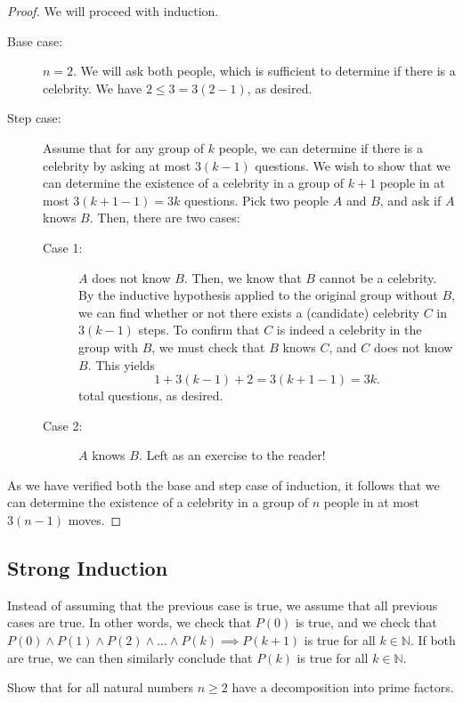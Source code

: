 \documentclass[a4paper]{article}
\begin{document}
\begin{proof}
	We will proceed with induction. 
	\begin{description}
		\item[Base case:] \( n=2 \). We will ask both people, which is sufficient to determine if there is a celebrity. We have \( 2 \le  3 = 3(2-1) \), as desired.
		\item[Step case:] Assume that for any group of \( k \) people, we can determine if there is a celebrity by asking at most \( 3(k-1) \) questions. We wish to show that we can determine the existence of a celebrity in a group of \( k+1 \) people in at most \( 3(k+1-1) =3k \) questions. Pick two people \( A \) and \( B \), and ask if \( A \) knows \( B \). Then, there are two cases:
			\begin{description}
				\item[Case 1:] \( A  \) does not know \( B \). Then, we know that \( B \) cannot be a celebrity. By the inductive hypothesis applied to the original group without \( B \), we can find whether or not there exists a (candidate) celebrity \( C \) in \( 3(k-1) \) steps. To confirm that \( C \) is indeed a celebrity in the group with \( B \), we must check that \( B \) knows \( C \), and \( C \) does not know \( B \). This yields \[
						1 + 3(k-1) + 2 = 3(k+1-1) = 3k
					.\] total questions, as desired.
				\item[Case 2:] \( A \) knows \( B \). Left as an exercise to the reader!
			\end{description}
	\end{description}
	As we have verified both the base and step case of induction, it follows that we can determine the existence of a celebrity in a group of \( n \) people in at most \( 3(n-1) \) moves.
\end{proof}

\subsection{Strong Induction}
Instead of assuming that the previous case is true, we assume that all previous cases are true. In other words, we check that \( P(0) \) is true, and we check that \( P(0) \land P(1) \land P(2) \land \ldots \land P(k) \implies P(k+1) \) is true for all \( k \in \mathbb{N} \). If both are true, we can then similarly conclude that \( P(k) \) is true for all \( k\in \mathbb{N} \).

\begin{eg}
	Show that for all natural numbers \( n\ge 2 \) have a decomposition into prime factors. 
\end{eg}
\end{document}
